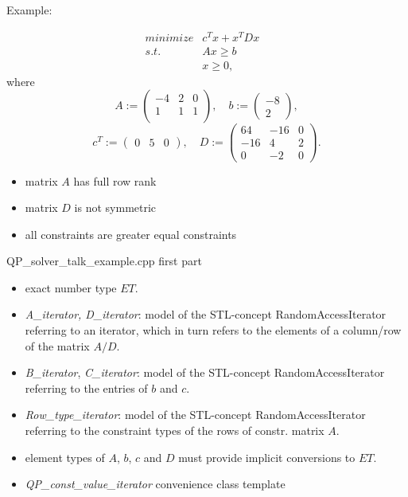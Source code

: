 \documentclass{slides}
\begin{document}
\begin{slide}
Example:

\begin{eqnarray*}
minimize & c^{T}x+x^{T}Dx & \\
s.t.     & Ax \geq b & \\
         & x \geq 0  ,&
\end{eqnarray*}
where
\[
A:=
\left(
\begin{array}{rrr}
-4 & 2 & 0 \\
1  & 1 & 1 \\
\end{array}
\right),
\quad
b:=
\left(
\begin{array}{r}
-8 \\
2
\end{array}
\right),
\]
\[
c^{T}:=
\left(
\begin{array}{rrr}
0 & 5 & 0
\end{array}
\right),
\quad
D:=
\left(
\begin{array}{rrr}
64  & -16 & 0 \\
-16 &   4 & 2 \\
0   &  -2 & 0 
\end{array}
\right).
\]
\end{slide}


\begin{note}
\begin{itemize}
\item  matrix $A$ has full row rank
\item  matrix $D$ is not symmetric
\item all constraints are greater equal constraints 
\end{itemize}
\end{note}

\begin{slide}
QP\_solver\_talk\_example.cpp first part
\end{slide}

\begin{note}
\begin{itemize}
\item exact number type $ET$.
\item \emph{A\_iterator, D\_iterator}: model of the STL-concept
RandomAccessIterator referring to an iterator, which in turn refers to the
elements of a column/row of the matrix $A/D$.
\item \emph{B\_iterator}, \emph{C\_iterator}: model of the STL-concept
RandomAccessIterator referring to the entries of $b$ and $c$.
\item \emph{Row\_type\_iterator}: model of the STL-concept
RandomAccessIterator referring to the constraint types of the rows of constr.
matrix $A$.  
\item element types of $A$, $b$, $c$ and $D$ must provide implicit conversions
to $ET$.
\item \emph{QP\_const\_value\_iterator} convenience class template
\end{itemize}
\end{note}
\end{document}
